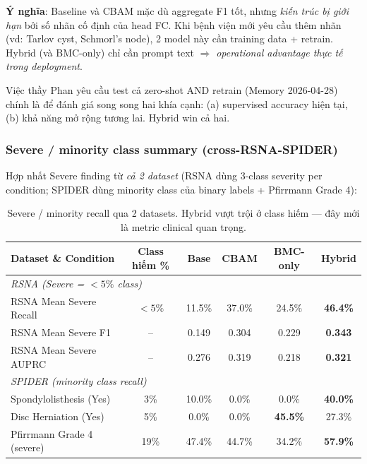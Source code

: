 \documentclass[11pt,a4paper]{article}
\newcommand{\best}[1]{\textcolor{best}{\textbf{#1}}}
\begin{document}
\noindent\textbf{Ý nghĩa}: Baseline và CBAM mặc dù aggregate F1 tốt,
nhưng \emph{kiến trúc bị giới hạn} bởi số nhãn cố định của head FC. Khi
bệnh viện mới yêu cầu thêm nhãn (vd: Tarlov cyst, Schmorl's node), 2
model này cần training data + retrain. Hybrid (và BMC-only) chỉ cần
prompt text $\Rightarrow$ \emph{operational advantage thực tế trong
deployment}.

\noindent Việc thầy Phan yêu cầu test cả zero-shot AND retrain (Memory
2026-04-28) chính là để đánh giá song song hai khía cạnh: (a) supervised
accuracy hiện tại, (b) khả năng mở rộng tương lai. Hybrid win cả hai.

\subsubsection*{Severe / minority class summary (cross-RSNA-SPIDER)}

\noindent Hợp nhất Severe finding từ \emph{cả 2 dataset} (RSNA dùng
3-class severity per condition; SPIDER dùng minority class của binary
labels + Pfirrmann Grade 4):

\begin{table}[h]
\centering
\caption{Severe / minority recall qua 2 datasets. Hybrid vượt trội ở
class hiếm --- đây mới là metric clinical quan trọng.}
\label{tab:severe_summary}
\small
\begin{tabular}{@{}lccccc@{}}
\toprule
\rowcolor{tablehdr}
Dataset \& Condition & Class hiếm \% & Base & CBAM & BMC-only & \best{Hybrid} \\
\midrule
\multicolumn{6}{l}{\emph{RSNA (Severe = $<5\%$ class)}} \\
RSNA Mean Severe Recall   & $<5\%$ & 11.5\% & 37.0\% & 24.5\% & \best{46.4\%} \\
RSNA Mean Severe F1       & --     & 0.149  & 0.304  & 0.229  & \best{0.343} \\
RSNA Mean Severe AUPRC    & --     & 0.276  & 0.319  & 0.218  & \best{0.321} \\
\midrule
\multicolumn{6}{l}{\emph{SPIDER (minority class recall)}} \\
Spondylolisthesis (Yes)   & 3\%   & 10.0\% & 0.0\%  & 0.0\%  & \best{40.0\%} \\
Disc Herniation (Yes)     & 5\%   & 0.0\%  & 0.0\%  & \best{45.5\%} & 27.3\% \\
Pfirrmann Grade 4 (severe)& 19\%  & 47.4\% & 44.7\% & 34.2\% & \best{57.9\%} \\
\bottomrule
\end{tabular}
\end{table}
\end{document}
